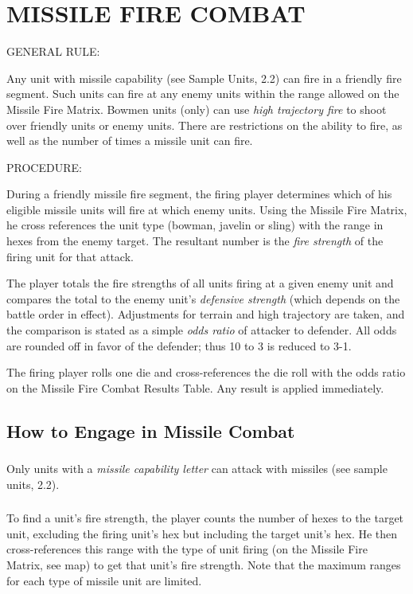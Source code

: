 \section{MISSILE FIRE COMBAT}
\hfill

GENERAL RULE:

Any unit with missile capability (see Sample Units, 2.2) can fire in a friendly fire segment. Such units can fire at any enemy units within the range allowed on the Missile Fire Matrix. Bowmen units (only) can use \textit{high trajectory fire} to shoot over friendly units or enemy units. There are restrictions on the ability to fire, as well as the number of times a missile unit can fire.

PROCEDURE:

During a friendly missile fire segment, the firing player determines which of his eligible missile units will fire at which enemy units. Using the Missile Fire Matrix, he cross references the unit type (bowman, javelin or sling) with the range in hexes from the enemy target. The resultant number is the \textit{fire strength} of the firing unit for that attack.

The player totals the fire strengths of all units firing at a given enemy unit and compares the total to the enemy unit's \textit{defensive strength} (which depends on the battle order in effect). Adjustments for terrain and high trajectory are taken, and the comparison is stated as a simple \textit{odds ratio} of attacker to defender. All odds are rounded off in favor of the defender; thus 10 to 3 is reduced to 3-1.

The firing player rolls one die and cross-references the die roll with the odds ratio on the Missile Fire Combat Results Table. Any result is applied immediately.

\subsection{How to Engage in Missile Combat}

\subsubsection[Missile Capability]{} Only units with a \textit{missile capability letter} can attack with missiles (see sample units, 2.2).

\subsubsection[Missile Strength]{} To find a unit's fire strength, the player counts the number of hexes to the target unit, excluding the firing unit's hex but including the target unit's hex. He then cross-references this range with the type of unit firing (on the Missile Fire Matrix, see map) to get that unit's fire strength. Note that the maximum ranges for each type of missile unit are limited.

